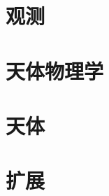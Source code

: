 \documentclass[a4paper,10pt,twoside,openany]{ctexbook}
\begin{document}
    \begin{titlepage}
        
    \end{titlepage}
    \newpage
    \begin{multicols*}{2}
        \begin{center}
            \tableofcontents
            \thispagestyle{empty}
        \end{center}
    \end{multicols*}
    
    
    
    
    
    \part{观测}{
        
        
        
        
        
        
    }

    \part{天体物理学}{
        
        
        
    }

    \part{天体}{
        
        
        
        
        
        
        
        
        
        
        
    }

    \part{扩展}{
        
        
    }
    
    
\end{document}
